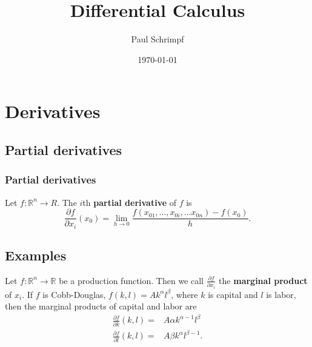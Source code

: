 \documentclass[compress]{beamer}
\title{Differential Calculus}
\author{Paul Schrimpf}
\institute{UBC \\ Economics 526}
\date{\today}
\def\R{\mathbb{R}}
\renewcommand{\to}{{\rightarrow}}
\begin{document}
\frame{\titlepage}



\begin{frame}
  \tableofcontents  
\end{frame}

\section{Derivatives}

\subsection{Partial derivatives}
\begin{frame}
  \frametitle{Partial derivatives}
  \begin{definition}
    Let $f:\R^n \to R$. The $i$th \textbf{partial derivative} of $f$ is 
    \[ \frac{\partial f}{\partial x_i} (x_0) = \lim_{h \to 0}
    \frac{f(x_{01},...,x_{0i}, ... x_{0n}) - f(x_0)}{h}. \]
  \end{definition}
\end{frame}
\subsection{Examples}
\begin{frame}
\begin{example}
  Let $f:\R^n \to \R$ be a production function. Then we call
  $\frac{\partial f}{\partial x_i}$ the \textbf{marginal product} of
  $x_i$. If $f$ is Cobb-Douglas, $f(k,l) = Ak^\alpha l^\beta$, where
  $k$ is capital and $l$ is labor, then the marginal products of
  capital and labor are
  \begin{align*}
    \frac{\partial f}{\partial k} (k,l) = & A \alpha k^{\alpha-1}
    l^\beta \\
    \frac{\partial f}{\partial l} (k,l) = & A \beta k^{\alpha}
    l^{\beta -1}.
  \end{align*}
\end{example}
\end{frame}
\end{document}
